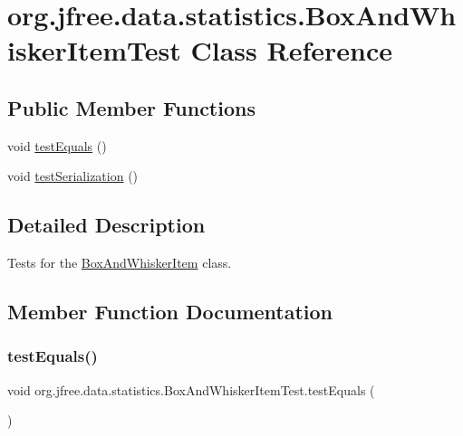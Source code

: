 \hypertarget{classorg_1_1jfree_1_1data_1_1statistics_1_1_box_and_whisker_item_test}{}\section{org.\+jfree.\+data.\+statistics.\+Box\+And\+Whisker\+Item\+Test Class Reference}
\label{classorg_1_1jfree_1_1data_1_1statistics_1_1_box_and_whisker_item_test}
\subsection*{Public Member Functions}
\begin{DoxyCompactItemize}
\item 
void \mbox{\hyperlink{classorg_1_1jfree_1_1data_1_1statistics_1_1_box_and_whisker_item_test_a8d9afae4ae9143bb4ccb71281209cdbf}{test\+Equals}} ()
\item 
void \mbox{\hyperlink{classorg_1_1jfree_1_1data_1_1statistics_1_1_box_and_whisker_item_test_ada19738b98305ad963282587f779d2d8}{test\+Serialization}} ()
\end{DoxyCompactItemize}


\subsection{Detailed Description}
Tests for the \mbox{\hyperlink{classorg_1_1jfree_1_1data_1_1statistics_1_1_box_and_whisker_item}{Box\+And\+Whisker\+Item}} class. 

\subsection{Member Function Documentation}
\mbox{\label{classorg_1_1jfree_1_1data_1_1statistics_1_1_box_and_whisker_item_test_a8d9afae4ae9143bb4ccb71281209cdbf}} 
\subsubsection{\texorpdfstring{test\+Equals()}{testEquals()}}
{\footnotesize\ttfamily void org.\+jfree.\+data.\+statistics.\+Box\+And\+Whisker\+Item\+Test.\+test\+Equals (\begin{DoxyParamCaption}{ }\end{DoxyParamCaption})}

